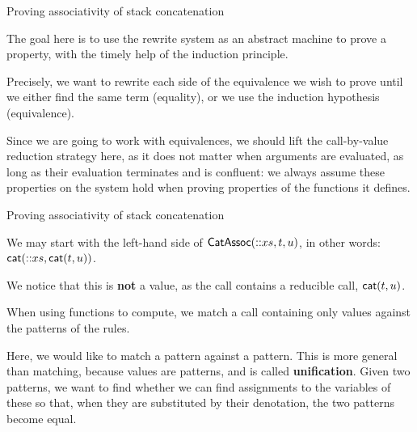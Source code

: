 %
\begin{frame}{Proving associativity of stack concatenation}

  The goal here is to use the rewrite system as an abstract machine to
  prove a property, with the timely help of the induction principle.

  \bigskip

  Precisely, we want to rewrite each side of the equivalence we wish
  to prove until we either find the same term (equality), or we use
  the induction hypothesis (equivalence).

  \bigskip

  Since we are going to work with equivalences, we should lift the
  call\hyp{}by\hyp{}value reduction strategy here, as it does not
  matter when arguments are evaluated, as long as their evaluation
  terminates and is confluent: we always assume these properties on
  the system hold when proving properties of the functions it defines.

\end{frame}

%
\begin{frame}{Proving associativity of stack concatenation}

  We may start with the left\hyp{}hand side of
  \(\textsf{CatAssoc}({\textsf{::}{x}{s},t,u})\), in other words:
  \(\textsf{cat}(\textsf{::}{x}{s},\textsf{cat}(t,u))\).

  \bigskip

  We notice that this is \textbf{not} a value, as the call contains a
  reducible call, \(\textsf{cat}(t,u)\).

  \bigskip

  When using functions to compute, we match a call containing only
  values against the patterns of the rules.

  \bigskip

  Here, we would like to match a pattern against a pattern. This is
  more general than matching, because values are patterns, and is
  called \textbf{unification}. Given two patterns, we want to find
  whether we can find assignments to the variables of these so that,
  when they are substituted by their denotation, the two patterns
  become equal.

\end{frame}

